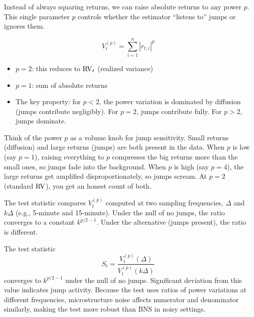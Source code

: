 \begin{definition}
Instead of always squaring returns, we can raise absolute returns to any power $p$.
This single parameter $p$ controls whether the estimator ``listens to'' jumps or ignores them.

\begin{equation}
  V_t^{(p)} = \sum_{i=1}^{n} |r_{t,i}|^p
  \label{eq:power-var}
\end{equation}
\begin{itemize}[nosep]
  \item $p = 2$: this reduces to $\operatorname{RV}_t$ (realized variance)
  \item $p = 1$: sum of absolute returns
  \item The key property: for $p < 2$, the power variation is dominated by diffusion (jumps contribute negligibly). For $p = 2$, jumps contribute fully. For $p > 2$, jumps dominate.
\end{itemize}

\begin{intuition}
Think of the power $p$ as a volume knob for jump sensitivity.
Small returns (diffusion) and large returns (jumps) are both present in the data.
When $p$ is low (say $p = 1$), raising everything to $p$ compresses the big returns more than the small ones, so jumps fade into the background.
When $p$ is high (say $p = 4$), the large returns get amplified disproportionately, so jumps scream.
At $p = 2$ (standard $\operatorname{RV}$), you get an honest count of both.
\end{intuition}
\end{definition}

The \citet{AitSahaliaJacod2009} test statistic compares $V_t^{(p)}$ computed at two sampling frequencies, $\Delta$ and $k\Delta$ (e.g., 5-minute and 15-minute).
Under the null of no jumps, the ratio converges to a constant $k^{p/2-1}$.
Under the alternative (jumps present), the ratio is different.

\begin{keyresult}
The test statistic
\[
  S_t = \frac{V_t^{(p)}(\Delta)}{V_t^{(p)}(k\Delta)}
\]
converges to $k^{p/2-1}$ under the null of no jumps.
Significant deviation from this value indicates jump activity.
Because the test uses ratios of power variations at different frequencies, microstructure noise affects numerator and denominator similarly, making the test more robust than BNS in noisy settings.
\end{keyresult}

